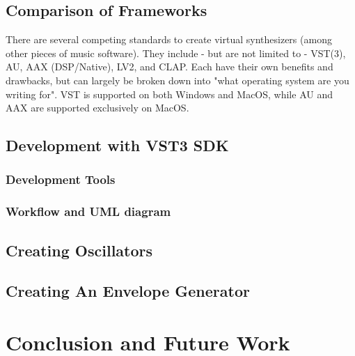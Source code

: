 \documentclass[12pt]{article}
\begin{document}
\subsection{Comparison of Frameworks}
There are several competing standards to create virtual synthesizers (among other pieces of music software). They include - but are not limited to - VST(3), AU, AAX (DSP/Native), LV2, and CLAP. Each have their own benefits and drawbacks, but can largely be broken down into "what operating system are you writing for". VST is supported on both Windows and MacOS, while AU and AAX are supported exclusively on MacOS. 

\subsection{Development with VST3 SDK}

\subsubsection{Development Tools}

\subsubsection{Workflow and UML diagram}

\subsection{Creating Oscillators}

\subsection{Creating An Envelope Generator}

\section{Conclusion and Future Work}




\end{document}
